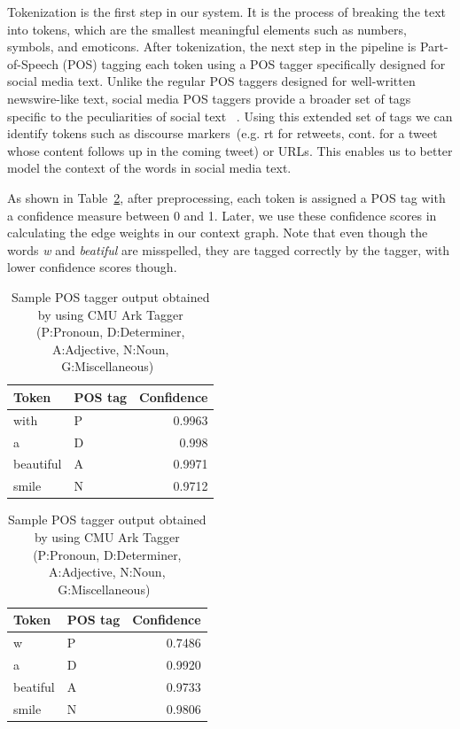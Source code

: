 \documentclass[preprint,review,12pt]{elsarticle}
\begin{document}
Tokenization is the first step in our system. It is the process of breaking the text into tokens, which are the smallest meaningful elements such as numbers, symbols, and emoticons. After tokenization, the next step in the pipeline is Part-of-Speech (POS) tagging each token using a POS tagger specifically designed for social media text. Unlike the regular POS taggers designed for well-written newswire-like text, social media POS taggers provide a broader set of tags specific to the peculiarities of social text ~\cite{owoputi2013improved,Gimpel:2011:PTT:2002736.2002747}. Using this extended set of tags we can identify tokens such as discourse markers~(e.g. rt for retweets, cont. for a tweet whose content follows up in the coming tweet) or URLs. This enables us to better model the context of the words in social media text.

As shown in Table~\ref{tab:postags}, after preprocessing, each token is assigned a POS tag with a confidence measure between 0 and 1. Later, we use these confidence scores in calculating the edge weights in our context graph. Note that even though the words \emph{w} and\emph{ beatiful} are misspelled, they are tagged correctly by the tagger, with lower confidence scores though.

\begin{table}[htbp]
\begin{minipage}{.5\linewidth}
\begin{tabular}[h]{|llr|}
 \hline
Token & POS tag & Confidence \\
 \hline
with & P & 0.9963 \\
 \hline
a & D & 0.998 \\
 \hline
beautiful & A & 0.9971 \\
 \hline
smile & N & 0.9712 \\
 \hline
\end{tabular}
\end{minipage}
\begin{minipage}{.5\linewidth}
\begin{tabular}[h]{|llr|}
 \hline
Token & POS tag & Confidence \\
 \hline
w & P & 0.7486 \\
 \hline
a & D & 0.9920 \\
 \hline
beatiful & A & 0.9733 \\
 \hline
smile & N & 0.9806 \\
 \hline
\end{tabular}
\end{minipage}
\caption{Sample POS tagger output obtained by using CMU Ark Tagger (P:Pronoun, D:Determiner, A:Adjective, N:Noun, G:Miscellaneous)~\cite{owoputi2013improved,Gimpel:2011:PTT:2002736.2002747}}
\label{tab:postags}
\end{table}
\end{document}
